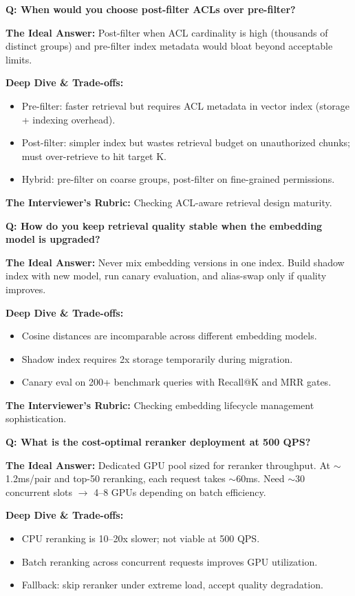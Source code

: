 \textbf{Q: When would you choose post-filter ACLs over pre-filter?}

\textbf{The Ideal Answer:} Post-filter when ACL cardinality is high (thousands of distinct groups) and pre-filter index metadata would bloat beyond acceptable limits.

\textbf{Deep Dive \& Trade-offs:}
\begin{itemize}
  \item Pre-filter: faster retrieval but requires ACL metadata in vector index (storage + indexing overhead).
  \item Post-filter: simpler index but wastes retrieval budget on unauthorized chunks; must over-retrieve to hit target K.
  \item Hybrid: pre-filter on coarse groups, post-filter on fine-grained permissions.
\end{itemize}

\textbf{The Interviewer's Rubric:} Checking ACL-aware retrieval design maturity.

\textbf{Q: How do you keep retrieval quality stable when the embedding model is upgraded?}

\textbf{The Ideal Answer:} Never mix embedding versions in one index. Build shadow index with new model, run canary evaluation, and alias-swap only if quality improves.

\textbf{Deep Dive \& Trade-offs:}
\begin{itemize}
  \item Cosine distances are incomparable across different embedding models.
  \item Shadow index requires 2x storage temporarily during migration.
  \item Canary eval on 200+ benchmark queries with Recall@K and MRR gates.
\end{itemize}

\textbf{The Interviewer's Rubric:} Checking embedding lifecycle management sophistication.

\textbf{Q: What is the cost-optimal reranker deployment at 500 QPS?}

\textbf{The Ideal Answer:} Dedicated GPU pool sized for reranker throughput. At $\sim$1.2ms/pair and top-50 reranking, each request takes $\sim$60ms. Need $\sim$30 concurrent slots $\rightarrow$ 4--8 GPUs depending on batch efficiency.

\textbf{Deep Dive \& Trade-offs:}
\begin{itemize}
  \item CPU reranking is 10--20x slower; not viable at 500 QPS.
  \item Batch reranking across concurrent requests improves GPU utilization.
  \item Fallback: skip reranker under extreme load, accept quality degradation.
\end{itemize}

